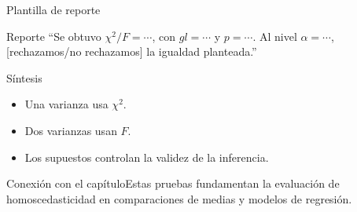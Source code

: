 \documentclass[10pt,aspectratio=169]{beamer}
\begin{document}
\begin{frame}{Plantilla de reporte}\small\begin{block}{Reporte} ``Se obtuvo $\chi^2/F=\cdots$, con $gl=\cdots$ y $p=\cdots$. Al nivel $\alpha=\cdots$, [rechazamos/no rechazamos] la igualdad planteada.''\end{block}\end{frame}
\begin{frame}{Síntesis}\small\begin{itemize}\item Una varianza usa $\chi^2$.\item Dos varianzas usan $F$.\item Los supuestos controlan la validez de la inferencia.\end{itemize}\end{frame}
\begin{frame}{Conexión con el capítulo}\small Estas pruebas fundamentan la evaluación de homoscedasticidad en comparaciones de medias y modelos de regresión.\end{frame}
\end{document}
